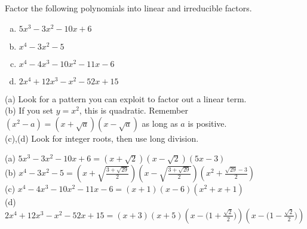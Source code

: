 \begin{question} Factor the following polynomials into linear and irreducible factors.
\begin{enumerate}[(a)]
\item $5x^3-3x^2-10x+6$
\item $x^4-3x^2-5$
\item $x^4-4x^3-10x^2-11x-6$
\item $2x^4+12x^3-x^2-52x+15$
\end{enumerate}
\end{question}
\begin{hint}
(a) Look for a pattern you can exploit to factor out a linear term.\\
(b) If you set $y=x^2$, this is quadratic. Remember $(x^2-a)= (x+\sqrt{a})(x-\sqrt{a})$ as long as $a$ is positive.\\
(c),(d) Look for integer roots, then use long division.
\end{hint}
\begin{answer}
(a) $5x^3-3x^2-10x+6=(x+\sqrt{2})(x-\sqrt{2})(5x-3)$\\[10pt]
(b)  $x^4-3x^2-5=\displaystyle\left(x+\sqrt{\frac{3+\sqrt{29}}{2}}\right)\left(x-\sqrt{\frac{3+\sqrt{29}}{2}}\right)\left(x^2+\frac{\sqrt{29}-3}{2}\right)$\\[10pt]
(c) $x^4-4x^3-10x^2-11x-6 = (x+1)(x-6)(x^2+x+1)$\\
(d) $2x^4+12x^3-x^2-52x+15= (x+3)(x+5)
                 \left(x-\Big(1+\frac{\sqrt2}{2}\Big)\right)
                 \left(x-\Big(1-\frac{\sqrt2}{2}\Big)\right)$
\end{answer}
